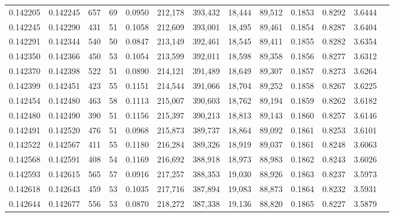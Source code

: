 \begin{tabular}{rrrrrrrrrrrrr}
0.142205 & 0.142245 &   657 &  69 &                                     0.0950 & 212,178 & 393,432 &  18,444 &  89,512 & 0.1853 & 0.8292 & 3.6444 \\
0.142245 & 0.142290 &   431 &  51 &                                     0.1058 & 212,609 & 393,001 &  18,495 &  89,461 & 0.1854 & 0.8287 & 3.6404 \\
0.142291 & 0.142344 &   540 &  50 &                                     0.0847 & 213,149 & 392,461 &  18,545 &  89,411 & 0.1855 & 0.8282 & 3.6354 \\
0.142350 & 0.142366 &   450 &  53 &                                     0.1054 & 213,599 & 392,011 &  18,598 &  89,358 & 0.1856 & 0.8277 & 3.6312 \\
0.142370 & 0.142398 &   522 &  51 &                                     0.0890 & 214,121 & 391,489 &  18,649 &  89,307 & 0.1857 & 0.8273 & 3.6264 \\
0.142399 & 0.142451 &   423 &  55 &                                     0.1151 & 214,544 & 391,066 &  18,704 &  89,252 & 0.1858 & 0.8267 & 3.6225 \\
0.142454 & 0.142480 &   463 &  58 &                                     0.1113 & 215,007 & 390,603 &  18,762 &  89,194 & 0.1859 & 0.8262 & 3.6182 \\
0.142480 & 0.142490 &   390 &  51 &                                     0.1156 & 215,397 & 390,213 &  18,813 &  89,143 & 0.1860 & 0.8257 & 3.6146 \\
0.142491 & 0.142520 &   476 &  51 &                                     0.0968 & 215,873 & 389,737 &  18,864 &  89,092 & 0.1861 & 0.8253 & 3.6101 \\
0.142522 & 0.142567 &   411 &  55 &                                     0.1180 & 216,284 & 389,326 &  18,919 &  89,037 & 0.1861 & 0.8248 & 3.6063 \\
0.142568 & 0.142591 &   408 &  54 &                                     0.1169 & 216,692 & 388,918 &  18,973 &  88,983 & 0.1862 & 0.8243 & 3.6026 \\
0.142593 & 0.142615 &   565 &  57 &                                     0.0916 & 217,257 & 388,353 &  19,030 &  88,926 & 0.1863 & 0.8237 & 3.5973 \\
0.142618 & 0.142643 &   459 &  53 &                                     0.1035 & 217,716 & 387,894 &  19,083 &  88,873 & 0.1864 & 0.8232 & 3.5931 \\
0.142644 & 0.142677 &   556 &  53 &                                     0.0870 & 218,272 & 387,338 &  19,136 &  88,820 & 0.1865 & 0.8227 & 3.5879 \\

\end{tabular}
